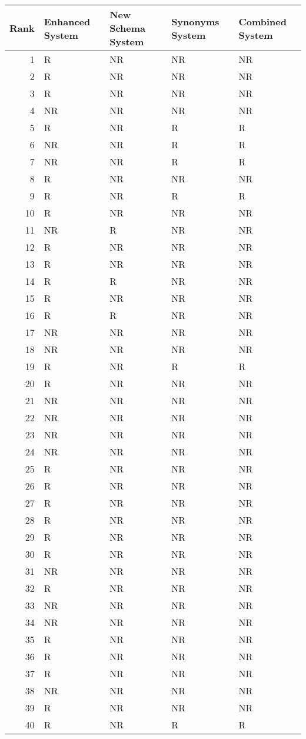 \begin{tabular}{rllll}
\toprule
Rank & Enhanced System & New Schema System & Synonyms System & Combined System \\
\midrule
1 & R & NR & NR & NR \\
2 & R & NR & NR & NR \\
3 & R & NR & NR & NR \\
4 & NR & NR & NR & NR \\
5 & R & NR & R & R \\
6 & NR & NR & R & R \\
7 & NR & NR & R & R \\
8 & R & NR & NR & NR \\
9 & R & NR & R & R \\
10 & R & NR & NR & NR \\
11 & NR & R & NR & NR \\
12 & R & NR & NR & NR \\
13 & R & NR & NR & NR \\
14 & R & R & NR & NR \\
15 & R & NR & NR & NR \\
16 & R & R & NR & NR \\
17 & NR & NR & NR & NR \\
18 & NR & NR & NR & NR \\
19 & R & NR & R & R \\
20 & R & NR & NR & NR \\
21 & NR & NR & NR & NR \\
22 & NR & NR & NR & NR \\
23 & NR & NR & NR & NR \\
24 & NR & NR & NR & NR \\
25 & R & NR & NR & NR \\
26 & R & NR & NR & NR \\
27 & R & NR & NR & NR \\
28 & R & NR & NR & NR \\
29 & R & NR & NR & NR \\
30 & R & NR & NR & NR \\
31 & NR & NR & NR & NR \\
32 & R & NR & NR & NR \\
33 & NR & NR & NR & NR \\
34 & NR & NR & NR & NR \\
35 & R & NR & NR & NR \\
36 & R & NR & NR & NR \\
37 & R & NR & NR & NR \\
38 & NR & NR & NR & NR \\
39 & R & NR & NR & NR \\
40 & R & NR & R & R \\
\bottomrule
\end{tabular}
